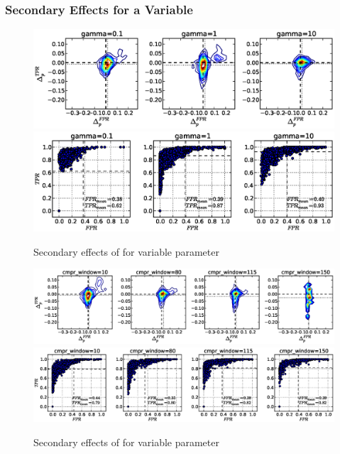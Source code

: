\clearpage
\subsubsection{Secondary Effects for a Variable }

\begin{figure}[!h]
\begin{center}
\includegraphics[width=6in]{../fig/final/delta_hist_sec/detection_window_hrs/gamma}
\includegraphics[width=5.5in]{../fig/final/position/all_allowed/detection_window_hrs/gamma}
\end{center}
\caption{\label{fig:delta_sec6} Secondary effects of  for
  variable parameter }
\end{figure}

\begin{figure}[!h]
\begin{center}
\includegraphics[width=6in]{../fig/final/delta_hist_sec/detection_window_hrs/cmpr_window}
\includegraphics[width=5.5in]{../fig/final/position/all_allowed/detection_window_hrs/cmpr_window}
\end{center}
\caption{\label{fig:delta_sec6} Secondary effects of  for
  variable parameter }
\end{figure}


